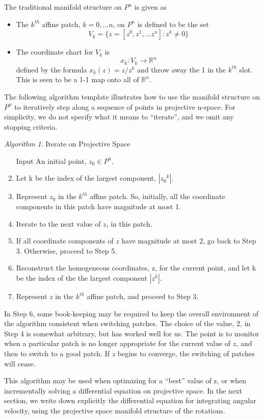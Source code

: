 \documentclass{gen-j-l}
\theoremstyle{definition}
\theoremstyle{remark}
\numberwithin{equation}{section}
\providecommand{\R}{{\mathbb R}}
\newtheorem{algorithm}{Algorithm}[section]
\begin{document}
The traditional manifold structure
on $P^n$ is given as

\begin{itemize}
\item The $k^{th}$ affine patch, $k = 0, \ldots n$,  on $P^n$ is defined to be the set
\begin{equation*}
  V_k = \{ z = [z^0, z^1, \ldots z^n] : z^k \neq 0 \}
\end{equation*}
\item The coordinate chart for $V_k$ is 
\begin{equation*}
x_k : V_k \longrightarrow \R^n
\end{equation*}
defined by the formula $x_k(z) = z / z^k$ and throw away the 1 in the $k^{th}$ slot.
This is seen to be a 1-1 map onto all of $\R^n$.
\end{itemize}

The following algorithm template illustrates how to use the 
manifold structure on $P^n$ to iteratively step along a sequence of points
in projective n-space.  For simplicity, we do not specify what it means
to ``iterate'', and we omit any stopping criteria.

\begin{algorithm}{Iterate on Projective Space} 
\begin{enumerate}
\item[ Input ] An initial point, $z_0 \in P^n$.
\item Let k be the index of the largest component, $|{z_0}^k|$.
\item Represent $z_0$ in the $k^{th}$ affine patch.  So, initially,
all the coordinate components in this patch have magnitude at most 1.
\item Iterate to the next value of $z$, in this patch.
\item If all coordinate components of $z$ have magnitude at most 2, 
go back to Step 3.  Otherwise, proceed to Step 5.
\item Reconstruct the homogeneous coordinates, z, for the current
point, and let k be the index of the the largest component $|z^k|$.
\item Represent $z$ in the $k^{th}$ affine patch, and proceed
to Step 3.
\end{enumerate}
In Step 6, some book-keeping may be required to keep the overall
environment of the algorithm consistent when switching patches.  The
choice of the value, 2, in Step 4 is somewhat arbitrary, but has worked
well for us.  The point is to monitor when a particular patch is no longer
appropriate for the current value of $z$, and then to switch to a good patch.
If $z$ begins to converge, the switching of patches will cease.  
\end{algorithm}
This algorithm may be used when optimizing for a ``best'' value of z,
or when incrementally solving a differential equation on projective space.
In the next section, we write down explicitly the differential equation for
integrating angular velocity, using the projective space manifold structure
of the rotations.
\end{document}
